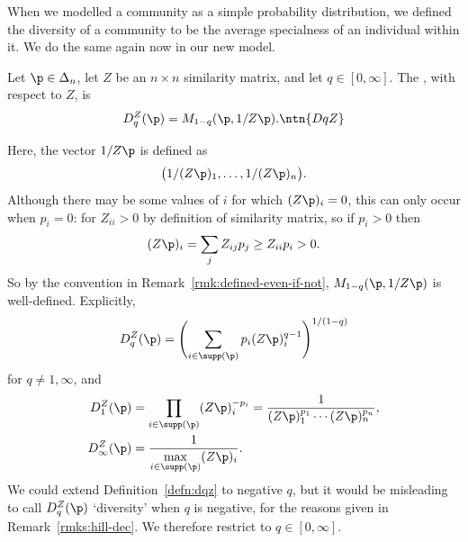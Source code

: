 When we modelled a community as a simple probability distribution, we
defined the diversity of a community to be the average specialness of an
individual within it. We do the same again now in our new model.

\begin{defn}
Let $\p \in \Delta_n$, let $Z$ be an $n \times n$ similarity matrix, 
and let $q \in [0, \infty]$.  The ,%
%
%
%
with respect to $Z$, is 
\[
D_q^Z(\p)
=
M_{1 - q}(\p, 1/Z\p).
\ntn{DqZ}
\]
\end{defn}

Here, the vector $1/Z\p$ is defined as 
\[
\bigl( 1/(Z\p)_1, \ldots, 1/(Z\p)_n \bigr).
\]
Although there may be some values of $i$ for which $(Z\p)_i = 0$, this can
only occur when $p_i = 0$: for $Z_{ii} > 0$ by definition of similarity
matrix, so if $p_i > 0$ then
\[
(Z\p)_i = \sum_j Z_{ij} p_j \geq Z_{ii} p_i > 0.
\]
So by the convention in Remark~\ref{rmk:defined-even-if-not}, $M_{1 -
  q}(\p, 1/Z\p)$ is well-defined.  Explicitly,
\[
D_q^Z(\p)
=
\Biggl( 
\sum_{i \in \supp(\p)} p_i (Z\p)_i^{q - 1} 
\Biggr)^{1/(1 - q)}
\]
for $q \neq 1, \infty$, and 
% 
\begin{align*}
D_1^Z(\p)       &
=
\prod_{i \in \supp(\p)} (Z\p)_i^{-p_i}
=
\frac{1}{(Z\p)_1^{p_1} \cdots (Z\p)_n^{p_n}},   \\
D_\infty^Z(\p)  &
=
\frac{1}{\max\limits_{i \in \supp(\p)} (Z\p)_i}.
\end{align*}
% 
We could extend Definition~\ref{defn:dqz} to negative $q$, but it would be
misleading to call $D_q^Z(\p)$ `diversity'%
% 
% 
when $q$ is negative, for the reasons given in
Remark~\ref{rmks:hill-dec}.  We therefore restrict
to $q \in [0, \infty]$.

